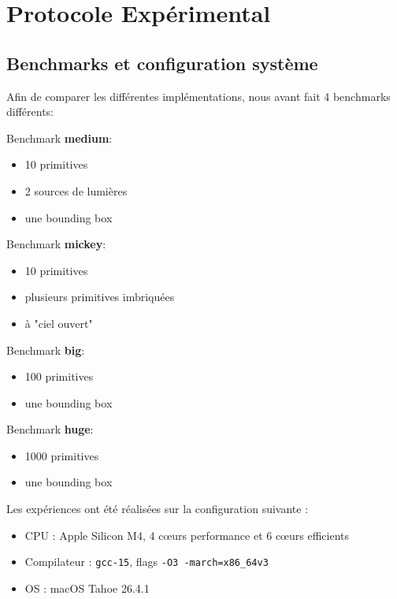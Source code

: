 \section{Protocole Expérimental}
\subsection{Benchmarks et configuration système}

Afin de comparer les différentes implémentations, nous avant fait 4 benchmarks différents:

Benchmark \textbf{medium}:
\begin{itemize}
	\item 10 primitives
	\item 2 sources de lumières
	\item une bounding box\\
\end{itemize}

Benchmark \textbf{mickey}:
\begin{itemize}
	\item 10 primitives
	\item plusieurs primitives imbriquées
	\item à "ciel ouvert"\\
\end{itemize}

Benchmark \textbf{big}:
\begin{itemize}
	\item 100 primitives
	\item une bounding box\\
\end{itemize}

Benchmark \textbf{huge}:
\begin{itemize}
	\item 1000 primitives
	\item une bounding box\\
\end{itemize}



Les expériences ont été réalisées sur la configuration suivante :
\begin{itemize}
    \item[$\bullet$] CPU : Apple Silicon M4, 4 c\oe urs performance   et 6 c\oe urs efficients
    \item[$\bullet$] Compilateur : \texttt{gcc-15}, flags \texttt{-O3 -march=x86\_64v3}
    \item[$\bullet$] OS : macOS Tahoe 26.4.1
\end{itemize}



